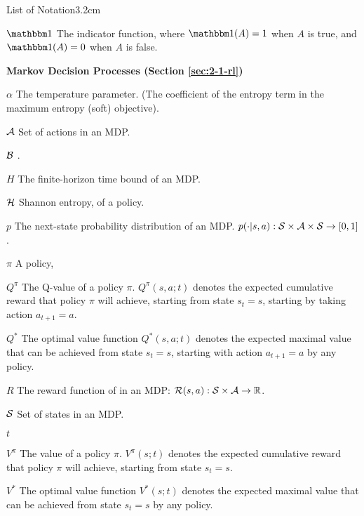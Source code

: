 \begin{mclistof}{List of Notation}{3.2cm}


    \item[$\one$] 
        The indicator function, where $\one(A)=1$ when $A$ is true, and $\one(A)=0$ when $A$ is false. \\
    
    \item[\Large\textbf{Markov Decision Processes (Section \ref{sec:2-1-rl})}\hfill\hfill]
    \item[$\alpha$] 
        The temperature parameter. (The coefficient of the entropy term in the maximum entropy (soft) objective).
    \item[$\mathcal{A}$] 
        Set of actions in an MDP.
    \item[$\mathcal{B}$]
        .
    \item[$H$] 
        The finite-horizon time bound of an MDP. 
    \item[$\mathcal{H}$]
        Shannon entropy, of a policy.
    \item[$p$] 
        The next-state probability distribution of an MDP.  $p(\cdot | s,a) : \mathcal{S} \times \mathcal{A} \times \mathcal{S} \rightarrow [0,1]$.
    \item[$\pi$]
        A policy, 
    \item[$Q^{\pi}$]
        The Q-value of a policy $\pi$. $Q^{\pi}(s,a;t)$ denotes the expected cumulative reward that policy $\pi$ will achieve, starting from state $s_t=s$, starting by taking action $a_{t+1}=a$.
    \item[$Q^*$]
        The optimal value function $Q^*(s,a;t)$ denotes the expected maximal value that can be achieved from state $s_t=s$, starting with action $a_{t+1}=a$ by any policy.
    \item[$R$] 
        The reward function of in an MDP: $\mathcal{R}(s,a) : \mathcal{S}\times \mathcal{A}\rightarrow \mathbb{R}$.
    \item[$\mathcal{S}$] 
        Set of states in an MDP. 
    \item[$t$] 
    \item[$V^{\pi}$]
        The value of a policy $\pi$. $V^{\pi}(s;t)$ denotes the expected cumulative reward that policy $\pi$ will achieve, starting from state $s_t=s$.
    \item[$V^*$]
        The optimal value function $V^*(s;t)$ denotes the expected maximal value that can be achieved from state $s_t=s$ by any policy.
    \\
    

\end{mclistof}
